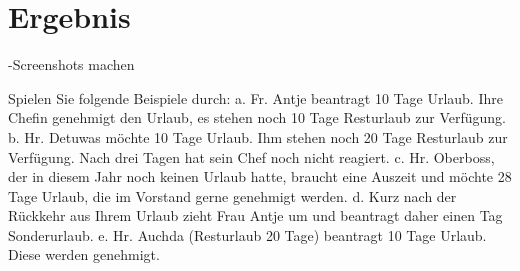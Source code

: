 \section{Ergebnis}
-Screenshots machen

Spielen Sie folgende Beispiele durch:
a. Fr. Antje beantragt 10 Tage Urlaub. Ihre Chefin genehmigt den Urlaub, es stehen noch 10
Tage Resturlaub zur Verfügung.
b. Hr. Detuwas möchte 10 Tage Urlaub. Ihm stehen noch 20 Tage Resturlaub zur Verfügung.
Nach drei Tagen hat sein Chef noch nicht reagiert.
c. Hr. Oberboss, der in diesem Jahr noch keinen Urlaub hatte, braucht eine Auszeit und möchte
28 Tage Urlaub, die im Vorstand gerne genehmigt werden.
d. Kurz nach der Rückkehr aus Ihrem Urlaub zieht Frau Antje um und beantragt daher einen Tag
Sonderurlaub.
e. Hr. Auchda (Resturlaub 20 Tage) beantragt 10 Tage Urlaub. Diese werden genehmigt.